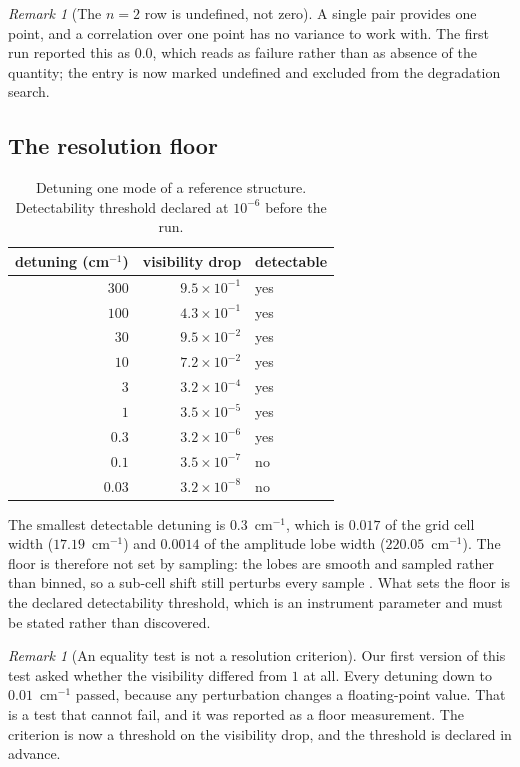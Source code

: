 \documentclass[11pt,twocolumn,a4paper]{article}
\theoremstyle{upthm}
\theoremstyle{definition}
\theoremstyle{remark}
\newtheorem{remark}[theorem]{Remark}
\begin{document}
\begin{remark}[The $n=2$ row is undefined, not zero]
\label{rem:n2}
A single pair provides one point, and a correlation over one point has no
variance to work with. The first run reported this as $0.0$, which reads
as failure rather than as absence of the quantity; the entry is now
marked undefined and excluded from the degradation search.
\end{remark}

\subsection{The resolution floor}

\begin{table}[htbp]
\centering\small
\caption{Detuning one mode of a reference structure. Detectability
threshold declared at $10^{-6}$ before the run.}
\label{tab:floor}
\begin{tabular}{@{}rrl@{}}
\toprule
detuning (cm$^{-1}$) & visibility drop & detectable\\
\midrule
$300$   & $9.5\times10^{-1}$ & yes\\
$100$   & $4.3\times10^{-1}$ & yes\\
$30$    & $9.5\times10^{-2}$ & yes\\
$10$    & $7.2\times10^{-2}$ & yes\\
$3$     & $3.2\times10^{-4}$ & yes\\
$1$     & $3.5\times10^{-5}$ & yes\\
$0.3$   & $3.2\times10^{-6}$ & yes\\
$0.1$   & $3.5\times10^{-7}$ & no\\
$0.03$  & $3.2\times10^{-8}$ & no\\
\bottomrule
\end{tabular}
\end{table}

The smallest detectable detuning is $0.3$~cm$^{-1}$, which is $0.017$ of
the grid cell width ($17.19$~cm$^{-1}$) and $0.0014$ of the amplitude
lobe width ($220.05$~cm$^{-1}$). The floor is therefore not set by
sampling: the lobes are smooth and sampled rather than binned, so a
sub-cell shift still perturbs every sample \citep{shannon1949,nyquist1928}.
What sets the floor is the declared detectability threshold, which is an
instrument parameter and must be stated rather than discovered.

\begin{remark}[An equality test is not a resolution criterion]
\label{rem:floorcriterion}
Our first version of this test asked whether the visibility differed from
$1$ at all. Every detuning down to $0.01$~cm$^{-1}$ passed, because any
perturbation changes a floating-point value. That is a test that cannot
fail, and it was reported as a floor measurement. The criterion is now a
threshold on the visibility drop, and the threshold is declared in
advance.
\end{remark}
\end{document}
